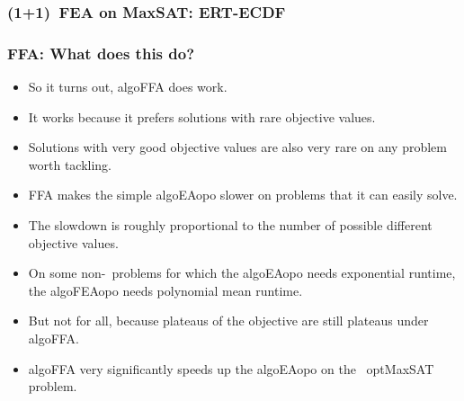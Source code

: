 \documentclass[aspectratio=169,mathserif,notheorems]{beamer}%
\begin{document}
%
\begin{frame}%
\frametitle{(1+1)~FEA on MaxSAT: ERT-ECDF}%
%
%
%
\end{frame}%
%
\begin{frame}%
\frametitle{FFA: What does this do?}%
%
\begin{itemize}%
\item So it turns out, \gls{algoFFA} does work.%
\item<2-> It works because it prefers solutions with rare objective values.%
\item<3-> Solutions with very good objective values are also very rare on any problem worth tackling.%
\item<4-> FFA makes the simple \gls{algoEAopo} slower on problems that it can easily solve.%
\item<5-> The slowdown is roughly proportional to the number of possible different objective values.%
\item<6-> On some non-\npHard\ problems for which the \gls{algoEAopo} needs \alert{exponential} runtime, the \gls{algoFEAopo} needs \alert{polynomial} mean runtime.%
\item<7-> But not for all, because plateaus of the objective are still plateaus under \gls{algoFFA}.%
\item<8-> \gls{algoFFA} very significantly speeds up the \gls{algoEAopo} on the \npComplete\ \gls{optMaxSAT} problem.%
\end{itemize}%
%
\end{frame}%
%
\end{document}
